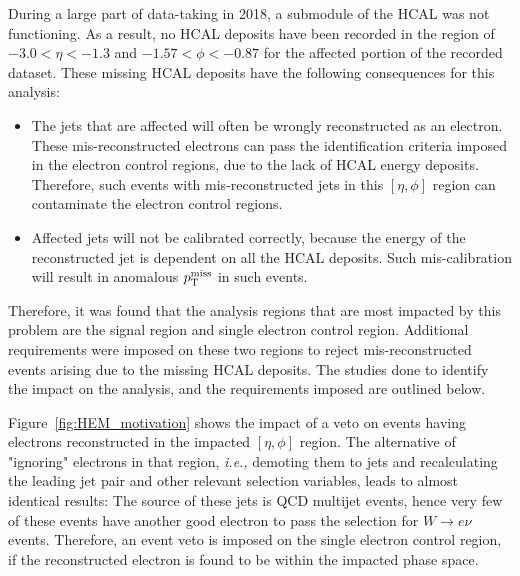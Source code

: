 During a large part of data-taking in 2018, a submodule of the HCAL was not
functioning. As a result, no HCAL deposits have been recorded in the region of
$-3.0 < \eta < -1.3$ and $-1.57 < \phi < -0.87$ for the affected portion of the
recorded dataset. These missing HCAL deposits have the following consequences
for this analysis:

\begin{itemize}
    \item The jets that are affected will often be wrongly reconstructed as an electron. These mis-reconstructed
    electrons can pass the identification criteria imposed in the electron control regions, due
    to the lack of HCAL energy deposits. Therefore, such events with mis-reconstructed jets in
    this $[\eta,\phi]$ region can contaminate the electron control regions.
    \item Affected jets will not be calibrated correctly, because the energy of the reconstructed jet
    is dependent on all the HCAL deposits. Such mis-calibration will result in anomalous $p_{\textrm{T}}^{\textrm{miss}}$ in such events. 
\end{itemize}

Therefore, it was found that the analysis regions that are most impacted by this problem are the signal region and single 
electron control region. Additional requirements were imposed on these two regions to reject mis-reconstructed events arising
due to the missing HCAL deposits. The studies done to identify the impact on the analysis, and the requirements imposed are
outlined below. 

Figure~\ref{fig:HEM_motivation} shows the impact of a veto on 
events having electrons reconstructed in the impacted $[\eta,\phi]$ region. 
The alternative of "ignoring" electrons in that region, \textit{i.e.,} demoting them to jets 
and recalculating the leading jet pair and other relevant selection variables, 
leads to almost identical results: The source of these jets is QCD multijet events, 
hence very few of these events have another good electron to pass the selection for 
$W \rightarrow e \nu$ events. Therefore, an event veto is imposed on the single electron
control region, if the reconstructed electron is found to be within the impacted phase space.


